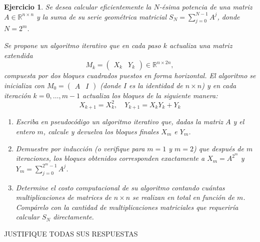 \documentclass[12pt]{article}%
\newtheorem{exercise}{Ejercicio}
\begin{document}
\begin{exercise}
Se desea calcular eficientemente la $N$-ésima potencia de una matriz $A \in \mathbb{R}^{n \times n}$ y la suma de su serie geométrica matricial $S_N = \sum_{j=0}^{N-1} A^j$, donde $N = 2^m$.

Se propone un algoritmo iterativo que en cada paso $k$ actualiza una matriz extendida $$M_k = \begin{pmatrix} X_k & Y_k \end{pmatrix} \in \mathbb{R}^{n \times 2n},$$ compuesta por dos bloques cuadrados puestos en forma horizontal. El algoritmo se inicializa con $M_0 = \begin{pmatrix} A & I \end{pmatrix}$ (donde $I$ es la identidad de $n \times n$) y en cada iteración $k = 0, \dots, m-1$ actualiza los bloques de la siguiente manera:
\begin{equation*}
    X_{k+1} = X_k^2, \quad Y_{k+1} = X_k Y_k + Y_k
\end{equation*}

\begin{enumerate}
    \item[a)] Escriba en pseudocódigo un algoritmo iterativo que, dadas la matriz $A$ y el entero $m$, calcule y devuelva los bloques finales $X_m$ e $Y_m$.

    \item[b)] Demuestre por inducción (o verifique para $m=1$ y $m=2$) que después de $m$ iteraciones, los bloques obtenidos corresponden exactamente a $X_m = A^{2^m}$ y $Y_m = \sum_{j=0}^{2^m-1} A^j$.

    \item[c)] Determine el costo computacional de su algoritmo contando cuántas multiplicaciones de matrices de $n \times n$ se realizan en total en función de $m$. Compárelo con la cantidad de multiplicaciones matriciales que requeriría calcular $S_N$ directamente.
\end{enumerate}

\end{exercise}



\vspace{2.5cm}

\begin{center}
JUSTIFIQUE TODAS SUS RESPUESTAS
\end{center}
\end{document}
